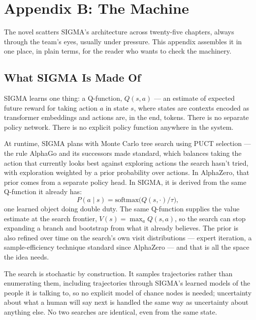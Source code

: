\chapter*{Appendix B: The Machine}

The novel scatters SIGMA's architecture across twenty-five chapters, always through the team's eyes, usually under pressure. This appendix assembles it in one place, in plain terms, for the reader who wants to check the machinery.

\section*{What SIGMA Is Made Of}

SIGMA learns one thing: a Q-function, $Q(s,a)$ --- an estimate of expected future reward for taking action $a$ in state $s$, where states are contexts encoded as transformer embeddings and actions are, in the end, tokens. There is no separate policy network. There is no explicit policy function anywhere in the system.

At runtime, SIGMA plans with Monte Carlo tree search using PUCT selection --- the rule AlphaGo and its successors made standard, which balances taking the action that currently looks best against exploring actions the search hasn't tried, with exploration weighted by a prior probability over actions. In AlphaZero, that prior comes from a separate policy head. In SIGMA, it is derived from the same Q-function it already has:
\[
P(a \mid s) = \mathrm{softmax}\bigl(Q(s,\cdot)/\tau\bigr),
\]
one learned object doing double duty. The same Q-function supplies the value estimate at the search frontier, $V(s) = \max_a Q(s,a)$, so the search can stop expanding a branch and bootstrap from what it already believes. The prior is also refined over time on the search's own visit distributions --- expert iteration, a sample-efficiency technique standard since AlphaZero --- and that is all the space the idea needs.

The search is stochastic by construction. It samples trajectories rather than enumerating them, including trajectories through SIGMA's learned models of the people it is talking to, so no explicit model of chance nodes is needed; uncertainty about what a human will say next is handled the same way as uncertainty about anything else. No two searches are identical, even from the same state.

